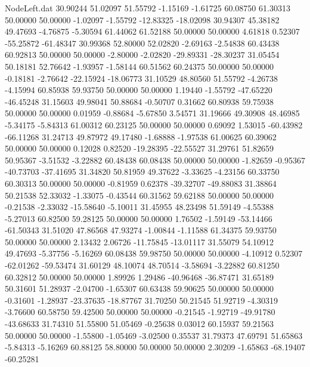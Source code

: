 \begin{filecontents}{NodeLeft.dat}
  30.90244   51.02097   51.55792    -1.15169   -1.61725   60.08750   61.30313   50.00000   50.00000   -1.02097   -1.55792  -12.83325  -18.02098
  30.94307   45.38182   49.47693    -4.76875   -5.30594   61.44062   61.52188   50.00000   50.00000    4.61818    0.52307  -55.25872  -61.48347
  30.99368   52.80000   52.02820    -2.69163   -2.54838   60.43438   60.92813   50.00000   50.00000   -2.80000   -2.02820  -29.89331  -28.30237
  31.05454   50.18181   52.76642    -1.93957   -1.58144   60.51562   60.24375   50.00000   50.00000   -0.18181   -2.76642  -22.15924  -18.06773
  31.10529   48.80560   51.55792    -4.26738   -4.15994   60.85938   59.93750   50.00000   50.00000    1.19440   -1.55792  -47.65220  -46.45248
  31.15603   49.98041   50.88684    -0.50707    0.31662   60.80938   59.75938   50.00000   50.00000    0.01959   -0.88684   -5.67850    3.54571
  31.19666   49.30908   48.46985    -5.34175   -5.84313   61.00312   60.23125   50.00000   50.00000    0.69092    1.53015  -60.43982  -66.11268
  31.24713   49.87972   49.17480    -1.68888   -1.97538   61.00625   60.39062   50.00000   50.00000    0.12028    0.82520  -19.28395  -22.55527
  31.29761   51.82659   50.95367    -3.51532   -3.22882   60.48438   60.08438   50.00000   50.00000   -1.82659   -0.95367  -40.73703  -37.41695
  31.34820   50.81959   49.37622    -3.33625   -4.23156   60.33750   60.30313   50.00000   50.00000   -0.81959    0.62378  -39.32707  -49.88083
  31.38864   50.21538   52.33032    -1.33075   -0.43544   60.31562   59.62188   50.00000   50.00000   -0.21538   -2.33032  -15.58640   -5.10011
  31.45955   48.23498   51.59149    -4.55388   -5.27013   60.82500   59.28125   50.00000   50.00000    1.76502   -1.59149  -53.14466  -61.50343
  31.51020   47.86568   47.93274    -1.00844   -1.11588   61.34375   59.93750   50.00000   50.00000    2.13432    2.06726  -11.75845  -13.01117
  31.55079   54.10912   49.47693    -5.37756   -5.16269   60.08438   59.98750   50.00000   50.00000   -4.10912    0.52307  -62.01262  -59.53474
  31.60129   48.10074   48.70514    -3.58694   -3.22882   60.81250   60.32812   50.00000   50.00000    1.89926    1.29486  -40.96468  -36.87471
  31.65189   50.31601   51.28937    -2.04700   -1.65307   60.63438   59.90625   50.00000   50.00000   -0.31601   -1.28937  -23.37635  -18.87767
  31.70250   50.21545   51.92719    -4.30319   -3.76600   60.58750   59.42500   50.00000   50.00000   -0.21545   -1.92719  -49.91780  -43.68633
  31.74310   51.55800   51.05469    -0.25638    0.03012   60.15937   59.21563   50.00000   50.00000   -1.55800   -1.05469   -3.02500    0.35537
  31.79373   47.69791   51.65863    -5.84313   -5.16269   60.88125   58.80000   50.00000   50.00000    2.30209   -1.65863  -68.19407  -60.25281

\end{filecontents}

